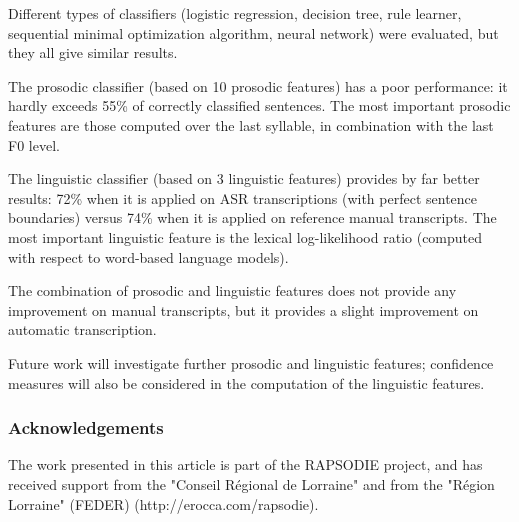 \documentclass[runningheads,a4paper]{llncs}
\begin{document}
Different types of classifiers (logistic regression, decision tree, rule learner, sequential minimal optimization algorithm, neural network) were evaluated, but they all give similar results.

The prosodic classifier (based on 10 prosodic features) has a poor performance: it hardly exceeds 55\% of correctly classified sentences.
The most important prosodic features are those computed over the last syllable, in combination with the last F0 level.

The linguistic classifier (based on 3 linguistic features) provides by far better results: 72\% when it is applied on ASR transcriptions (with perfect sentence boundaries) versus 74\% when it is applied on reference manual transcripts. The most important linguistic feature is  the lexical log-likelihood ratio (computed with respect to word-based language models).

The combination of prosodic and linguistic features does not provide any improvement on manual transcripts, but it provides a slight improvement on automatic transcription.

Future work will investigate further prosodic and linguistic features; confidence measures will also be considered in the computation of the linguistic features.

\subsubsection*{Acknowledgements}

The work presented in this article is part of the RAPSODIE project, and has received
support from the "Conseil R\'{e}gional de Lorraine" and from the "R\'{e}gion Lorraine" (FEDER) (http://erocca.com/rapsodie).




\end{document}
